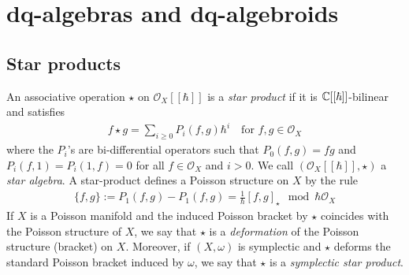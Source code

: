 \chapter{dq-algebras and dq-algebroids}\label{ch:DQ}
\section{Star products}
\begin{definition}\label{def:star-product}
	An associative operation $\star$ on $\mathscr{O}_{X}[[\hbar]]$ is a \textit{star product} if it is ${\mathbb C}[[\hbar]]$-bilinear and satisfies
	\begin{align}\label{eqn:star-product}
		f \star g = \sum_{i\geq 0} P_{i}(f,g)\hbar^{i} \quad \text{for } f,g\in \mathscr{O}_{X}
	\end{align}
	where the $P_{i}$'s are bi-differential operators such that $P_{0}(f, g)=fg$ and $P_{i}(f, 1)=P_{i}(1, f)=0$ for all $f \in \mathscr{O}_{X}$ and $i>0 .$ We call $\left(\mathscr{O}_{X}[[\hbar]], \star\right)$ a \textit{star algebra}. A star-product defines a Poisson structure on $X$ by the rule
	\begin{align}\label{eqn:poisson-induced-by-star-product}
		\{f,g\} := P_{1}(f,g) - P_{1}(f,g) = \frac{1}{\hbar}[f,g]_{\star} \mod \hbar\mathscr{O}_{X} 
	\end{align}
	If $X$ is a Poisson manifold and the induced Poisson bracket by $\star$ coincides with the Poisson structure of $X$, we say that $\star$ is a \textit{deformation} of the Poisson structure (bracket) on $X$. Moreover, if $(X,\omega)$ is symplectic and $\star$ deforms the standard Poisson bracket induced by $\omega$, we say that $\star$ is a \textit{symplectic star product}.
\end{definition}
